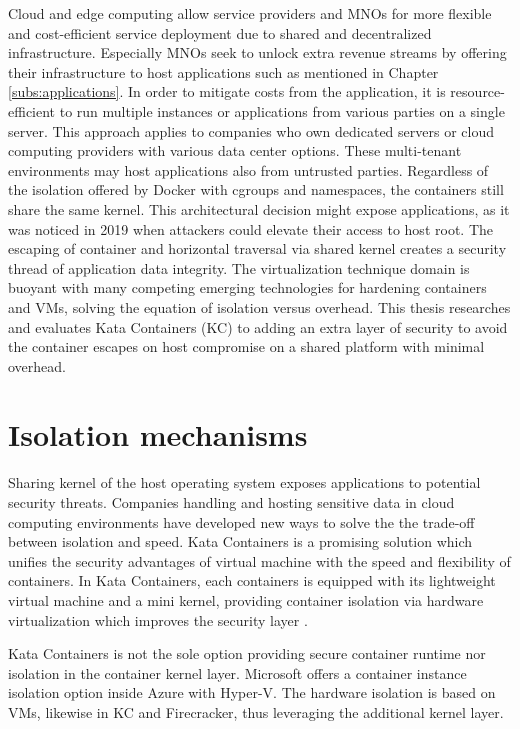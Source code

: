 Cloud and edge computing allow service providers and MNOs for more flexible and cost-efficient service deployment due to shared and decentralized infrastructure. Especially MNOs seek to unlock extra revenue streams by offering their infrastructure to host applications such as mentioned in Chapter \ref{subs:applications}. In order to mitigate costs from the application, it is resource-efficient to run multiple instances or applications from various parties on a single server. This approach applies to companies who own dedicated servers or cloud computing providers with various data center options. These multi-tenant environments may host applications also from untrusted parties. Regardless of the isolation offered by Docker with cgroups and namespaces, the containers still share the same kernel. This architectural decision might expose applications, as it was noticed in 2019 \cite{CVE-2020-14386}\cite{CVE-2019-5736} when attackers could elevate their access to host root. The escaping of container and horizontal traversal via shared kernel creates a security thread of application data integrity. The virtualization technique domain is buoyant with many competing emerging technologies for hardening containers and VMs, solving the equation of isolation versus overhead. This thesis researches and evaluates Kata Containers (KC) to adding an extra layer of security to avoid the container escapes on host compromise on a shared platform with minimal overhead. \cite{EdgeComputing5G}

\section{Isolation mechanisms}

Sharing kernel of the host operating system exposes applications to potential security threats. Companies handling and hosting sensitive data in cloud computing environments have developed new ways to solve the the trade-off between isolation and speed. Kata Containers is a promising solution which unifies the security advantages of virtual machine with the speed and flexibility of containers. In Kata Containers, each containers is equipped with its lightweight virtual machine and a mini kernel, providing container isolation via hardware virtualization which improves the security layer \cite{Kumar2020}.

Kata Containers is not the sole option providing secure container runtime nor isolation in the container kernel layer. Microsoft offers a container instance isolation option inside Azure with Hyper-V. The hardware isolation is based on VMs, likewise in KC and Firecracker, thus leveraging the additional kernel layer. \cite{Hyper-V}

